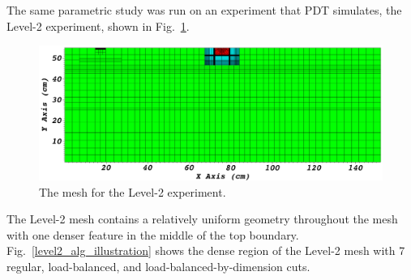 \documentclass[times,final]{elsarticle}
\begin{document}
The same parametric study was run on an experiment that PDT simulates, the Level-2 experiment, shown in Fig.~\ref{level2_nocut_lbchapter}.
\begin{figure}[ht]
\centering
\includegraphics[scale=0.25]{../figures/level2_nocut.png}
\caption{The mesh for the Level-2 experiment.}
\label{level2_nocut_lbchapter}
\end{figure}
The Level-2 mesh contains a relatively uniform geometry throughout the mesh with one denser feature in the middle of the top boundary.
Fig.~\ref{level2_alg_illustration} shows the dense region of the Level-2 mesh with 7 regular, load-balanced, and load-balanced-by-dimension cuts.
\end{document}
